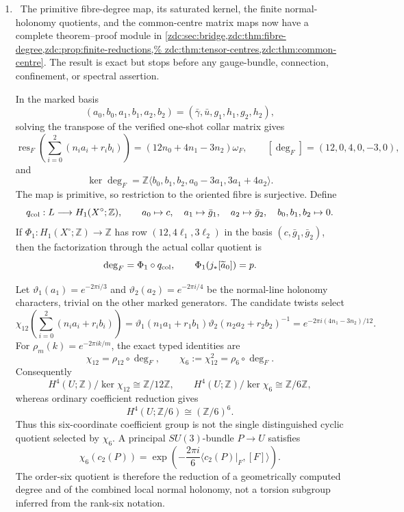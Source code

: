 \begin{enumerate}[leftmargin=1.8em]
\item \Verified\ The primitive fibre-degree map, its saturated kernel, the
finite normal-holonomy quotients, and the common-centre matrix maps now have a
complete theorem--proof module in
\cref{zdc:sec:bridge,zdc:thm:fibre-degree,zdc:prop:finite-reductions,%
zdc:thm:tensor-centres,zdc:thm:common-centre}.  The result is exact but stops
before any gauge-bundle, connection, confinement, or spectral assertion.

In the marked basis
\[
 (a_0,b_0,a_1,b_1,a_2,b_2)
 =(\bar\gamma,\bar u,g_1,h_1,g_2,h_2),
\]
solving the transpose of the verified one-shot collar matrix gives
\[
 \operatorname{res}_F\!\left(\sum_{i=0}^2(n_i a_i+r_i b_i)\right)
 =(12n_0+4n_1-3n_2)\omega_F,
 \qquad [\deg_F]=(12,0,4,0,-3,0),
\]
and
\[
 \ker\deg_F
 =\mathbb Z\langle
 b_0,b_1,b_2,a_0-3a_1,3a_1+4a_2\rangle.
\]
The map is primitive, so restriction to the oriented fibre is surjective.
Define
\[
 q_{\rm col}:L\longrightarrow H_1(X^\circ;\mathbb Z),\qquad
 a_0\mapsto c,\quad a_1\mapsto\bar g_1,\quad a_2\mapsto\bar g_2,\quad
 b_0,b_1,b_2\mapsto0.
\]
If \(\Phi_1:H_1(X^\circ;\mathbb Z)\to\mathbb Z\) has row
\((12,4\ell_1,3\ell_2)\) in the basis \((c,\bar g_1,\bar g_2)\), then the
factorization through the actual collar quotient is
\[
 \deg_F=\Phi_1\circ q_{\rm col},\qquad
 \Phi_1(j_*[\widetilde a_0])=p.
\]

Let \(\vartheta_1(a_1)=e^{-2\pi i/3}\) and
\(\vartheta_2(a_2)=e^{-2\pi i/4}\) be the normal-line holonomy characters,
trivial on the other marked generators.  The candidate twists select
\[
 \chi_{12}\!\left(\sum_{i=0}^2(n_i a_i+r_i b_i)\right)
 =\vartheta_1(n_1a_1+r_1b_1)
  \vartheta_2(n_2a_2+r_2b_2)^{-1}
 =e^{-2\pi i(4n_1-3n_2)/12}.
\]
For \(\rho_m(k)=e^{-2\pi ik/m}\), the exact typed identities are
\[
 \boxed{\chi_{12}=\rho_{12}\circ\deg_F,\qquad
        \chi_6:=\chi_{12}^2=\rho_6\circ\deg_F.}
\]
Consequently
\[
 H^4(U;\mathbb Z)/\ker\chi_{12}\cong\mathbb Z/12\mathbb Z,
 \qquad
 H^4(U;\mathbb Z)/\ker\chi_6\cong\mathbb Z/6\mathbb Z,
\]
whereas ordinary coefficient reduction gives
\[
 H^4(U;\mathbb Z/6)\cong(\mathbb Z/6)^6.
\]
Thus this six-coordinate coefficient group is not the single distinguished
cyclic quotient selected by \(\chi_6\).  A principal \(SU(3)\)-bundle
\(P\to U\) satisfies
\[
 \chi_6(c_2(P))
 =\exp\!\left(-\frac{2\pi i}{6}
 \langle c_2(P)|_F,[F]\rangle\right).
\]
The order-six quotient is therefore the reduction of a geometrically
computed degree and of the combined local normal holonomy, not a torsion
subgroup inferred from the rank-six notation.


\end{enumerate}
